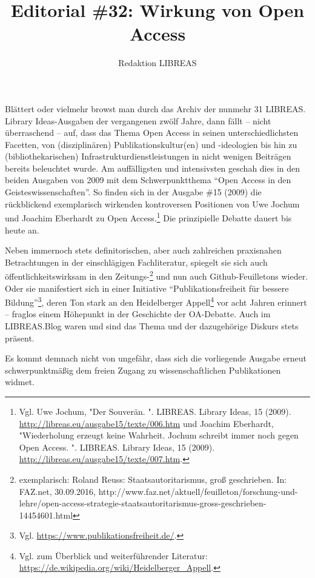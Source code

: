 \documentclass[a4paper,
fontsize=11pt,
oneside,
numbers=noperiodatend,
parskip=half-,
bibliography=totoc,
final
]{scrartcl}
\title{\LARGE{Editorial \#32: Wirkung von Open Access}} %
\author{Redaktion LIBREAS} %
\date{}
\begin{document}
\maketitle
\thispagestyle{fancyplain} 


Blättert oder vielmehr browst man durch das Archiv der nunmehr 31
LIBREAS. Library Ideas-Ausgaben der vergangenen zwölf Jahre, dann fällt
-- nicht überraschend -- auf, dass das Thema Open Access in seinen
unterschiedlichsten Facetten, von (disziplinären) Publikationskultur(en)
und -ideologien bis hin zu (bibliothekarischen)
Infrastrukturdienstleistungen in nicht wenigen Beiträgen bereits
beleuchtet wurde. Am auffälligsten und intensivsten geschah dies in den
beiden Ausgaben von 2009 mit dem Schwerpunktthema \enquote{Open Access
in den Geisteswissenschaften}. So finden sich in der Ausgabe \#15 (2009)
die rückblickend exemplarisch wirkenden kontroversen Positionen von Uwe
Jochum und Joachim Eberhardt zu Open Access.\footnote{Vgl. Uwe Jochum,
  "Der Souverän. ". LIBREAS. Library Ideas, 15 (2009).
  \url{http://libreas.eu/ausgabe15/texte/006.htm} und Joachim Eberhardt,
  "Wiederholung erzeugt keine Wahrheit. Jochum schreibt immer noch gegen
  Open Access. ". LIBREAS. Library Ideas, 15 (2009).
  \url{http://libreas.eu/ausgabe15/texte/007.htm}.} Die prinzipielle
Debatte dauert bis heute an.

Neben immernoch stets definitorischen, aber auch zahlreichen praxisnahen
Betrachtungen in der einschlägigen Fachliteratur, spiegelt sie sich auch
öffentlichkeitswirksam in den Zeitungs-\footnote{exemplarisch: Roland
  Reuss: Staatsautoritarismus, groß geschrieben. In: FAZ.net,
  30.09.2016,
  http://www.faz.net/aktuell/feuilleton/forschung-und-lehre/open-access-strategie-staatsautoritarismus-gross-geschrieben-14454601.html}
und nun auch Github-Feuilletons wieder. Oder sie manifestiert sich in
einer Initiative \enquote{Publikationsfreiheit für bessere
Bildung}\footnote{Vgl. \url{https://www.publikationsfreiheit.de/}.},
deren Ton stark an den Heidelberger Appell\footnote{Vgl. zum Überblick
  und weiterführender Literatur:
  \url{https://de.wikipedia.org/wiki/Heidelberger_Appell}.} vor acht
Jahren erinnert -- fraglos einem Höhepunkt in der Geschichte der
OA-Debatte. Auch im LIBREAS.Blog waren und sind das Thema und der
dazugehörige Diskurs stets präsent.

Es kommt demnach nicht von ungefähr, dass sich die vorliegende Ausgabe
erneut schwerpunktmäßig dem freien Zugang zu wissenschaftlichen
Publikationen widmet.
\end{document}

